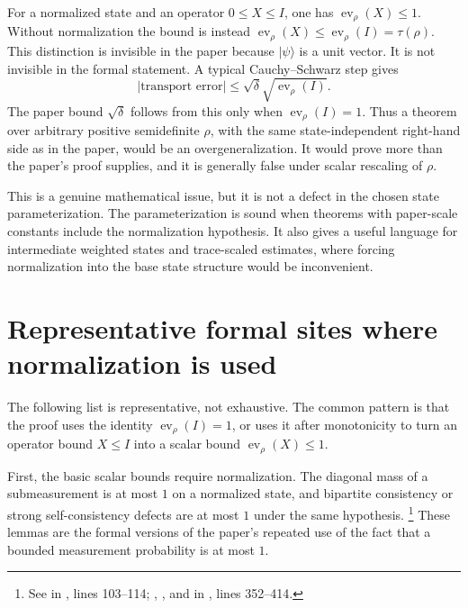 \documentclass[11pt]{article}
\newcommand{\ev}{\operatorname{ev}}
\begin{document}
For a normalized state and an operator $0\le X\le I$, one has
$\ev_\rho(X)\le 1$. Without normalization the bound is instead
$\ev_\rho(X)\le\ev_\rho(I)=\tau(\rho)$. This distinction is invisible in the
paper because $|\psi\rangle$ is a unit vector. It is not invisible in the
formal statement. A typical Cauchy--Schwarz step gives
\[
  |\text{transport error}|
    \le \sqrt{\delta} \sqrt{\ev_\rho(I)}.
\]
The paper bound $\sqrt\delta$ follows from this only when
$\ev_\rho(I)=1$. Thus a theorem over arbitrary positive semidefinite
$\rho$, with the same state-independent right-hand side as in the paper, would
be an overgeneralization. It would prove more than the paper's proof supplies,
and it is generally false under scalar rescaling of $\rho$.

This is a genuine mathematical issue, but it is not a defect in the chosen
state parameterization. The parameterization is sound when theorems with
paper-scale constants include the normalization hypothesis. It also gives a
useful language for intermediate weighted states and trace-scaled estimates,
where forcing normalization into the base state structure would be inconvenient.

\section{Representative formal sites where normalization is used}

The following list is representative, not exhaustive. The common pattern is
that the proof uses the identity $\ev_\rho(I)=1$, or uses it after monotonicity
to turn an operator bound $X\le I$ into a scalar bound $\ev_\rho(X)\le 1$.

First, the basic scalar bounds require normalization. The diagonal mass of a
submeasurement is at most $1$ on a normalized state, and bipartite consistency
or strong self-consistency defects are at most $1$ under the same hypothesis.
\footnote{See  in
, lines
103--114; ,
, and
 in ,
lines 352--414.}
These lemmas are the formal versions of the paper's repeated use of the fact
that a bounded measurement probability is at most $1$.
\end{document}
